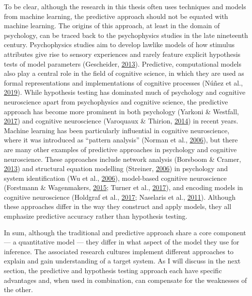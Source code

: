 \documentclass[11pt,american,a4paper,oneside,]{memoir} %
\begin{document}
To be clear, although the research in this thesis often uses techniques and models from machine learning, the predictive approach should not be equated with machine learning. The origins of this approach, at least in the domain of psychology, can be traced back to the psychophysics studies in the late nineteenth century. Psychophysics studies aim to develop lawlike models of how stimulus attributes give rise to sensory experiences and rarely feature explicit hypothesis tests of model parameters (Gescheider, \protect\hyperlink{ref-Gescheider2013-zm}{2013}). Predictive, computational models also play a central role in the field of cognitive science, in which they are used as formal representations and implementations of cognitive processes (Núñez et al., \protect\hyperlink{ref-Nunez2019-lh}{2019}). While hypothesis testing has dominated much of psychology and cognitive neuroscience apart from psychophysics and cognitive science, the predictive approach has become more prominent in both psychology (Yarkoni \& Westfall, \protect\hyperlink{ref-Yarkoni2017-om}{2017}) and cognitive neuroscience (Varoquaux \& Thirion, \protect\hyperlink{ref-Varoquaux2014-su}{2014}) in recent years. Machine learning has been particularly influential in cognitive neuroscience, where it was introduced as ``pattern analysis'' (Norman et al., \protect\hyperlink{ref-norman2006beyond}{2006}), but there are many other examples of predictive approaches in psychology and cognitive neuroscience. These approaches include network analysis (Borsboom \& Cramer, \protect\hyperlink{ref-Borsboom2013-wb}{2013}) and structural equation modelling (Streiner, \protect\hyperlink{ref-Streiner2006-ze}{2006}) in psychology and system identification (Wu et al., \protect\hyperlink{ref-Wu2006-qs}{2006}), model-based cognitive neuroscience (Forstmann \& Wagenmakers, \protect\hyperlink{ref-Forstmann2015-rz}{2015}; Turner et al., \protect\hyperlink{ref-Turner2017-fi}{2017}), and encoding models in cognitive neuroscience (Holdgraf et al., \protect\hyperlink{ref-Holdgraf2017-eu}{2017}; Naselaris et al., \protect\hyperlink{ref-Naselaris2011-oh}{2011}). Although these approaches differ in the way they construct and apply models, they all emphasize predictive accuracy rather than hypothesis testing.

In sum, although the traditional and predictive approach share a core component --- a quantitative model --- they differ in what aspect of the model they use for inference. The associated research cultures implement different approaches to explain and gain understanding of a target system. As I will discuss in the next section, the predictive and hypothesis testing approach each have specific advantages and, when used in combination, can compensate for the weaknesses of the other.
\end{document}
